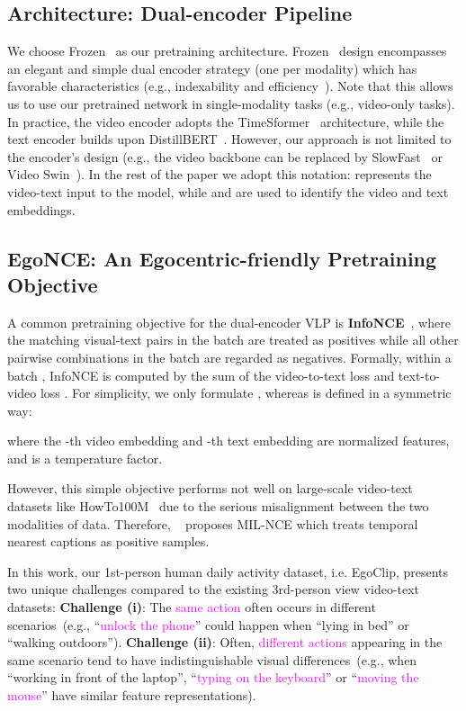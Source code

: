 \documentclass{article}
\newcommand{\howto}{HowTo100M}
\begin{document}
\subsection{Architecture: Dual-encoder Pipeline}
We choose Frozen~\cite{bain2021frozen} as our pretraining architecture. Frozen~\cite{bain2021frozen} design encompasses an elegant and simple dual encoder strategy (one per modality) which has favorable characteristics (e.g., indexability and efficiency~\cite{escorcia2019temporal,miech2021thinking}). Note that this allows us to use our pretrained network in single-modality tasks (e.g., video-only tasks). In practice, the video encoder adopts the TimeSformer~\cite{timesformer} architecture, while the text encoder builds upon DistillBERT~\cite{distilbert}. However, our approach is not limited to the encoder's design (e.g., the video backbone can be replaced by SlowFast~\cite{slowfast} or Video Swin~\cite{liu2022video}). 
In the rest of the paper we adopt this notation:  represents the video-text input to the model, while  and  are used to identify the video and text embeddings.

\subsection{EgoNCE: An Egocentric-friendly Pretraining Objective}
A common pretraining objective for the dual-encoder VLP is \textbf{InfoNCE}~\cite{infonce}, where the matching visual-text pairs in the batch are treated as positives while all other pairwise combinations in the batch are regarded as negatives. 
Formally, within a batch , InfoNCE is computed by the sum of the video-to-text loss  and text-to-video loss .
For simplicity, we only formulate , whereas  is defined in a symmetric way:

where the -th video embedding  and -th text embedding  are  normalized features, and  is a temperature factor.

However, this simple objective performs not well on large-scale video-text datasets like \howto~\cite{miech2019howto100m} due to the serious misalignment between the two modalities of data.
Therefore, ~\cite{mil_nce} proposes MIL-NCE which treats temporal nearest captions as positive samples. 

In this work, our 1st-person human daily activity dataset, i.e. EgoClip, presents two unique challenges compared to the existing 3rd-person view video-text datasets: \textbf{Challenge (i)}: The \textcolor{Fuchsia}{same action} often occurs in  \textcolor{citecolor}{different scenarios}~(e.g.,  ``\textcolor{Fuchsia}{unlock the phone}'' could happen when ``\textcolor{citecolor}{lying in bed}'' or ``\textcolor{citecolor}{walking outdoors}'').
\textbf{Challenge (ii)}: Often, \textcolor{Fuchsia}{different actions} appearing in the \textcolor{citecolor}{same scenario} tend to have indistinguishable visual differences~(e.g.,  when ``\textcolor{citecolor}{working in front of the laptop}'', ``\textcolor{Fuchsia}{typing on the keyboard}'' or ``\textcolor{Fuchsia}{moving the mouse}'' have similar feature representations).
\end{document}
